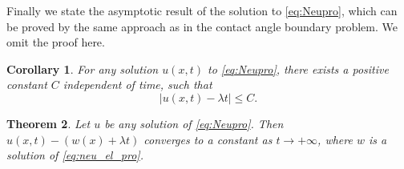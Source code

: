 \documentclass[12pt]{article}
\numberwithin{equation}{section}
\theoremstyle{plain}
\newtheorem{theorem}{Theorem}[section]
\newtheorem{corollary}[theorem]{Corollary}
\theoremstyle{definition}
\theoremstyle{remark}
\begin{document}
Finally we state the asymptotic result of the solution to \eqref{eq:Neupro}, which can be proved by the same approach as in the contact angle boundary problem. We omit the proof here.

\begin{corollary}
    For any solution $u(x,t)$ to \eqref{eq:Neupro}, there exists a positive constant $C$ independent of time, such that
    \begin{equation*}
        |u(x,t)-\lambda t| \leq C.
    \end{equation*}
\end{corollary}
\noindent
\begin{theorem}
Let $u$ be any solution of \eqref{eq:Neupro}. Then
    $u(x,t)-(w(x)+\lambda t)$ converges to a constant as $t\longrightarrow+\infty$, where $w$ is a solution of \eqref{eq:neu_el_pro}.
\end{theorem}






\end{document}
